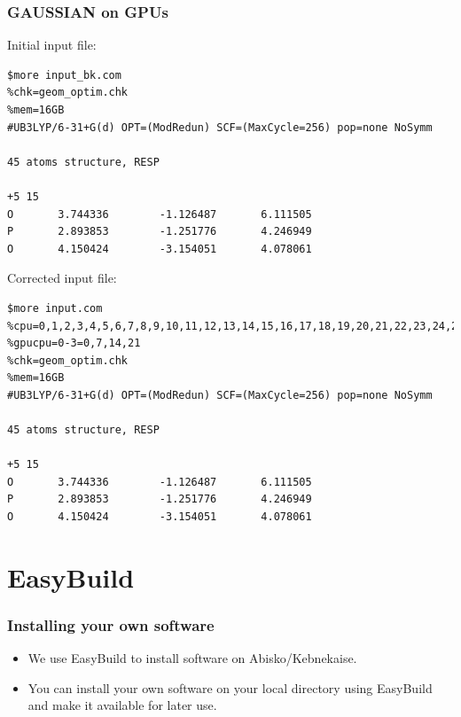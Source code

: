 \begin{frame}[fragile]
	\frametitle{GAUSSIAN on GPUs}
  
Initial input file:
{\tiny
        \begin{verbatim}             
$more input_bk.com 
%chk=geom_optim.chk
%mem=16GB
#UB3LYP/6-31+G(d) OPT=(ModRedun) SCF=(MaxCycle=256) pop=none NoSymm

45 atoms structure, RESP

+5 15
O       3.744336        -1.126487       6.111505
P       2.893853        -1.251776       4.246949
O       4.150424        -3.154051       4.078061
        \end{verbatim}
}

Corrected input file:

{\tiny
        \begin{verbatim}             
$more input.com 
%cpu=0,1,2,3,4,5,6,7,8,9,10,11,12,13,14,15,16,17,18,19,20,21,22,23,24,25,26,27
%gpucpu=0-3=0,7,14,21
%chk=geom_optim.chk
%mem=16GB
#UB3LYP/6-31+G(d) OPT=(ModRedun) SCF=(MaxCycle=256) pop=none NoSymm

45 atoms structure, RESP

+5 15
O       3.744336        -1.126487       6.111505
P       2.893853        -1.251776       4.246949
O       4.150424        -3.154051       4.078061
        \end{verbatim}
}


\end{frame}

\section{EasyBuild}
\begin{frame}[fragile]
	\frametitle{Installing your own software}
  
\begin{itemize}

\item We use EasyBuild to install software on Abisko/Kebnekaise.

\item You can install your own software on your local directory using EasyBuild
and make it available for later use.





\end{itemize}

\end{frame}

